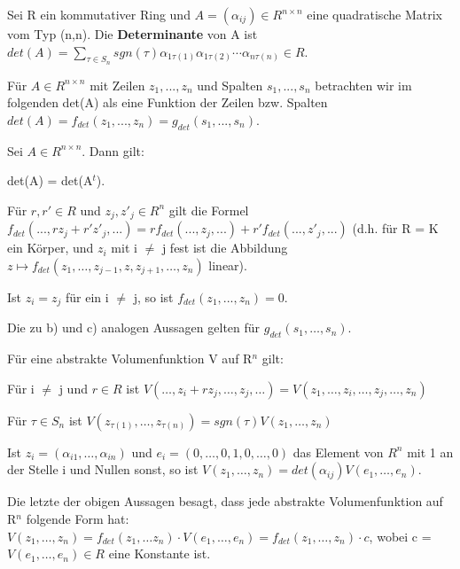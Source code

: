 \begin{definition}
Sei R ein kommutativer Ring und $A = (\alpha_{ij}) \in R^{n \times n}$ eine quadratische Matrix vom Typ (n,n). Die \textbf{Determinante} von A ist $det(A) = \sum\nolimits_{\tau \in S_n} sgn(\tau) \alpha_{1\tau(1)} \alpha_{1 \tau(2)} \cdots \alpha_{n \tau(n)} \in R$.
\end{definition}

Für $A \in R^{n \times n}$ mit Zeilen $z_1, ..., z_n$ und Spalten $s_1, ..., s_n$ betrachten wir im folgenden det(A) als eine Funktion der Zeilen bzw. Spalten $det(A) = f_{det}(z_1,..., z_n) = g_{det}(s_1, ..., s_n)$.

\begin{lemma}
Sei $A \in R^{n \times n}$. Dann gilt:
\begin{compactenum}
\item det(A) = det(A$^t$).
\item Für $r, r' \in R$ und $z_j,z'_j \in R^n$ gilt die Formel $f_{det}(...,rz_j + r'z'_j,...) = r f_{det}(...,z_j,...) + r' f_{det}(...,z'_j,...)$ (d.h. für R = K ein Körper, und $z_i$ mit i $\neq$ j fest ist die Abbildung $z \mapsto f_{det}(z_1,… , z_{j-1}, z, z_{j+1},… , z_n)$ linear). 
\item Ist $z_i = z_j$ für ein i $\neq$ j, so ist $f_{det}(z_1, ..., z_n) = 0$.
\item Die zu b) und c) analogen Aussagen gelten für $g_{det}(s_1, …, s_n)$.
\end{compactenum}
\end{lemma}

\begin{proposition}
Für eine abstrakte Volumenfunktion V auf R$^n$ gilt:
\begin{compactenum}
\item Für i $\neq$ j und $r \in R$ ist $V(…, z_i + rz_j, …, z_j, …) = V(z_1, …, z_i, …, z_j, …, z_n)$
\item Für $\tau \in S_n$ ist $V(z_{\tau(1)}, …, z_{\tau(n)}) = sgn(\tau)V(z_1, …, z_n)$
\item Ist $z_i = (\alpha_{i1}, …, \alpha_{in})$ und $e_i = (0, …, 0, 1, 0, …, 0)$ das Element von $R^n$ mit 1 an der Stelle i und Nullen sonst, so ist $V(z_1, …, z_n) = det(\alpha_{ij}) V(e_1, …, e_n)$.
\end{compactenum}
\end{proposition}

\begin{remark}
Die letzte der obigen Aussagen besagt, dass jede abstrakte Volumenfunktion auf R$^n$ folgende Form hat:
$V (z_1, …, z_n) = f_{det}(z_1, … z_n) \cdot V (e_1, …, e_n) = f_{det}(z_1, …, z_n) \cdot c$, wobei c = $V (e_1,…, e_n) \in R$ eine Konstante ist.
\end{remark}

